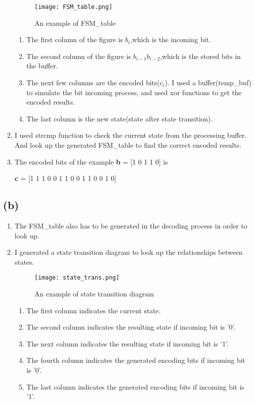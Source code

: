 \documentclass{article}
\begin{document}
\begin{CJK*}{UTF8}{bsmi}
\begin{enumerate}
    \begin{figure}[h]
    \centering
    \texttt{[image: FSM\_table.png]}
    \caption{\label{fig:FSM_table.png} An example of FSM\_table}
    \end{figure}
        \begin{enumerate}
            \item The first column of the figure is $b_i$,which is the incoming bit.
            \item The second column of the figure is $b_{i-1}b_{i-2}$,which is the stored bits in the buffer.
            \item The next few columns are the encoded bits($c_i$). I used a buffer(temp\_buf) to simulate the bit incoming process, and used xor functions to get the encoded results.
            \item The last column is the new state(state after state transition).
        \end{enumerate}
    
    
    \item I used strcmp function to check the current state from the processing buffer. And look up the generated FSM\_table to find the correct encoded results.
    \item The encoded bits of the example \textbf{b} = [1 0 1 1 0] is 
    
    \textbf{c} = [1     1     1     0     0     1     1     0     0     1     1     0     0     1     0]

    
\end{enumerate}

\subsection{(b)}
\begin{enumerate}
    \item The FSM\_table also has to be generated in the decoding process in order to look up. 
    \item I generated a state transition diagram to look up the relationships between states.
    \begin{figure}[h]
    \centering
    \texttt{[image: state\_trans.png]}
    \caption{\label{fig:state_trans.png} An example of state transition diagram}
    \end{figure}
        \begin{enumerate}
            \item The first column indicates the current state.
            \item The second column indicates the resulting state if incoming bit is '0'.
            \item The next column indicates the resulting state if incoming bit is '1'.
            \item The fourth column indicates the generated encoding bits if incoming bit is '0'.
            \item The last column indicates the generated encoding bits if incoming bit is '1'.
        \end{enumerate}
    

\end{enumerate}
\end{CJK*}
\end{document}

